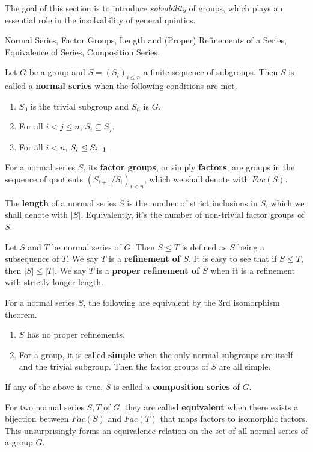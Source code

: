 \documentclass[../../book.tex]{subfiles}
\begin{document}
The goal of this section is to introduce \emph{solvability} of groups,
which plays an essential role in the insolvability of general quintics. 
\begin{dfn} Normal Series, Factor Groups, Length 
and (Proper) Refinements of a Series, Equivalence of Series, Composition Series.
    
    Let $G$ be a group and 
    $S = (S_i)_{i\leq n}$ a finite sequence of subgroups.
    Then $S$ is called a \textbf{normal series} when the following conditions are met.
    \begin{enumerate}
        \item $S_0$ is the trivial subgroup and $S_n$ is $G$. 
        \item For all $i < j \leq n$, $S_i \subseteq S_j$. 
        \item For all $i < n$, $S_i \trianglelefteq S_{i+1}$.
    \end{enumerate}
    For a normal series $S$, 
    its \textbf{factor groups}, or simply \textbf{factors},
    are groups in the sequence of quotients $(S_{i+1}/S_i)_{i<n}$,
    which we shall denote with $Fac(S)$.
    
    The \textbf{length} of a normal series $S$ is
    the number of strict inclusions in $S$, which we shall denote with $|S|$.
    Equivalently, it's the number of non-trivial factor groups of $S$. 
    
    Let $S$ and $T$ be normal series of $G$. 
    Then $S \leq T$ is defined as $S$ being a subsequence of $T$. 
    We say $T$ is a \textbf{refinement of $S$}.
    It is easy to see that if $S \leq T$, then $|S| \leq |T|$.
    We say $T$ is a \textbf{proper refinement of $S$}
    when it is a refinement with strictly longer length. 
    
    For a normal series $S$, 
    the following are equivalent by the 3rd isomorphism theorem.
    \begin{enumerate}
        \item $S$ has no proper refinements.
        \item For a group, it is called \textbf{simple} when
        the only normal subgroups are itself and the trivial subgroup.
        Then the factor groups of $S$ are all simple. 
    \end{enumerate}
    If any of the above is true, $S$ is called a \textbf{composition series} of $G$. 
    
    For two normal series $S, T$ of $G$, 
    they are called \textbf{equivalent} when 
    there exists a bijection between $Fac(S)$ and $Fac(T)$
    that maps factors to isomorphic factors. 
    This unsurprisingly forms an equivalence relation 
    on the set of all normal series of a group $G$. 
    
\end{dfn}
\end{document}
